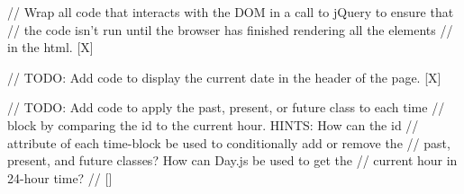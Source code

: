 // Wrap all code that interacts with the DOM in a call to jQuery to ensure that
// the code isn't run until the browser has finished rendering all the elements
// in the html. [X]

// TODO: Add code to display the current date in the header of the page. [X]

  // TODO: Add code to apply the past, present, or future class to each time
  // block by comparing the id to the current hour. HINTS: How can the id
  // attribute of each time-block be used to conditionally add or remove the
  // past, present, and future classes? How can Day.js be used to get the
  // current hour in 24-hour time?
  // []